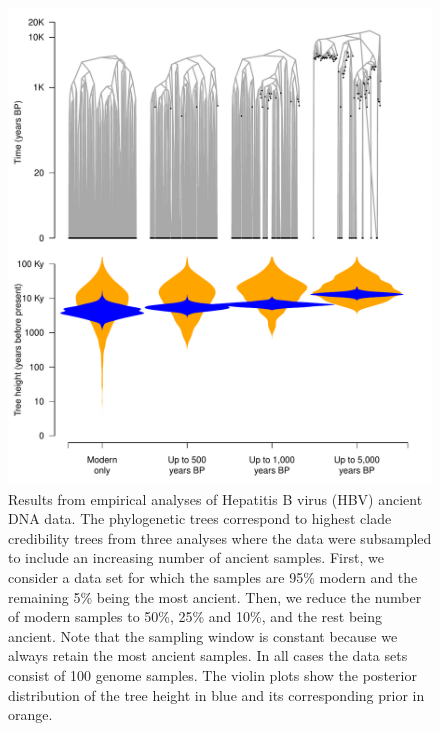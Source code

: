 \documentclass[11pt]{article}
\begin{document}
\begin{figure}[H]
    \begin{center}
        \includegraphics[scale=0.7, angle=0]{empirical_results_tree_height.pdf}
        \caption{Results from empirical analyses of Hepatitis B virus (HBV) ancient DNA data. The phylogenetic trees correspond to highest clade credibility trees from three analyses where the data were subsampled to include an increasing number of ancient samples. First, we consider a data set for which the samples are 95\% modern and the remaining 5\% being the most ancient. Then, we reduce the number of modern samples to 50\%, 25\% and 10\%, and the rest being ancient. Note that the sampling window is constant because we always retain the most ancient samples. In all cases the data sets consist of 100 genome samples. The violin plots show the posterior distribution of the tree height in blue and its corresponding prior in orange.}
        \label{figure:Fig2}
    \end{center}
\end{figure}
\end{document}

